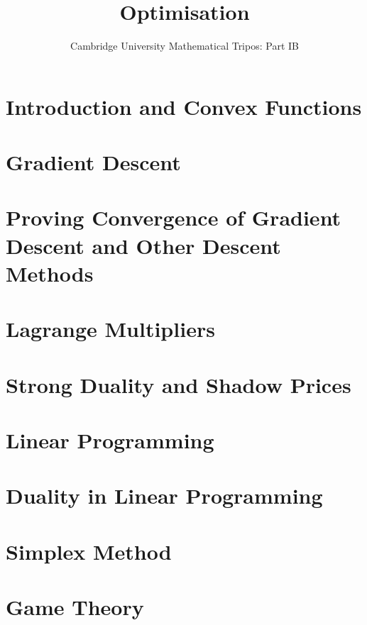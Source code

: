 \documentclass{article}
\title{Optimisation}
\author{Cambridge University Mathematical Tripos: Part IB}
\begin{document}
\maketitle

\tableofcontentsnewpage{}

\section{Introduction and Convex Functions}

\section{Gradient Descent}

\section{Proving Convergence of Gradient Descent and Other Descent Methods}

\section{Lagrange Multipliers}

\section{Strong Duality and Shadow Prices}

\section{Linear Programming}

\section{Duality in Linear Programming}

\section{Simplex Method}

\section{Game Theory}

\end{document}
